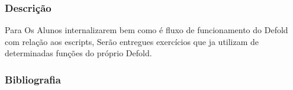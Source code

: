 \documentclass[letterpaper,10pt,brazil]{sphinxmanual}
\begin{document}
\subsubsection*{Descrição}

\sphinxAtStartPar
Para Os Alunos internalizarem bem como é fluxo de funcionamento do Defold com relação aos
escripts, Serão entregues exercícios que ja utilizam de determinadas funções do próprio Defold.
\def\sphinxLiteralBlockLabel{\label{\detokenize{modelo_aula_04:id1}}}
\begin{sphinxVerbatim}[commandchars=\\\{\}]
\end{sphinxVerbatim}
\def\sphinxLiteralBlockLabel{\label{\detokenize{modelo_aula_04:id2}}}
\begin{sphinxVerbatim}[commandchars=\\\{\}]

\end{sphinxVerbatim}
\def\sphinxLiteralBlockLabel{\label{\detokenize{modelo_aula_04:id3}}}
\begin{sphinxVerbatim}[commandchars=\\\{\}]
\end{sphinxVerbatim}

\newpage
\subsubsection*{Bibliografia}
\end{document}
